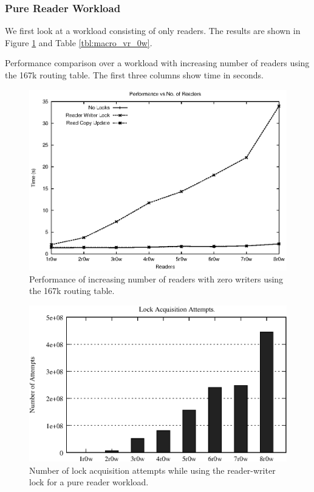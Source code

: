 \documentclass[a4paper,marginparwidth=50pt,marginparsep=10pt]{article}
\begin{document}
\subsubsection{Pure Reader Workload}
 We first look at a workload consisting of only readers. The results
 are shown in Figure \ref{img:macro_vr_0w} and Table
 \ref{tbl:macro_vr_0w}.

\begin{table}[tph]
\begin{center}

\end{center}
\caption{Performance comparison over a workload with increasing number of readers using the 167k routing table. The first three columns show time in seconds.}
\label{tbl:macro_vr_0w}
\end{table}

\begin{figure}[tph]
\includegraphics[scale = 0.7]{../images/graphs/macro_vr_0w}
\caption{Performance of increasing number of readers with zero writers using the 167k routing table.}
\label{img:macro_vr_0w}
\end{figure}

\begin{figure}[tph]
\includegraphics[scale = 0.7]{../images/graphs/profile_lockcount_macro_rwl_vr_0w}
\caption{Number of lock acquisition attempts while using the reader-writer lock for a pure reader workload.}
\label{img:profile_rwl_locks_vr_0w}
\end{figure}
\end{document}
